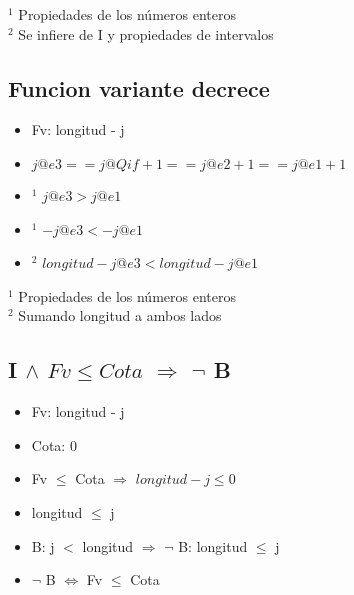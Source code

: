 \vspace{3mm}

\noindent $ ^1 $ Propiedades de los números enteros\\
$ ^2 $ Se infiere de I y propiedades de intervalos\\

\subsection{Funcion variante decrece}
\begin{itemize}
	\item Fv: longitud - j
	\item $ j@e3 == j@Qif + 1 == j@e2 + 1 == j@e1 + 1 $
	\item $ ^1 $ $ j@e3 > j@e1 $
	\item $ ^1 $ $ - j@e3 < - j@e1 $
	\item $ ^2 $ \textcolor{NavyBlue}{ $ longitud - j@e3 < longitud - j@e1 $} \checkmark	
\end{itemize}
\vspace{3mm}

\noindent $ ^1 $ Propiedades de los números enteros\\
$ ^2 $ Sumando longitud a ambos lados\\

\subsection{I $ \land $ $ Fv \leq Cota $ $ \Rightarrow $ $ \lnot $ B}
\begin{itemize}
	\item Fv: longitud - j
	\item Cota: 0
	\item Fv $ \leq $ Cota $ \Rightarrow $ $ longitud - j \leq 0 $ 
	\item longitud $ \leq $ j
	\item B: j $ < $ longitud $ \Rightarrow $ $ \lnot $ B: longitud $ \leq $ j
	\item \textcolor{NavyBlue}{ $ \lnot $ B $ \Leftrightarrow $ Fv  $ \leq $ Cota} \checkmark	
\end{itemize}
\vspace{3mm}


